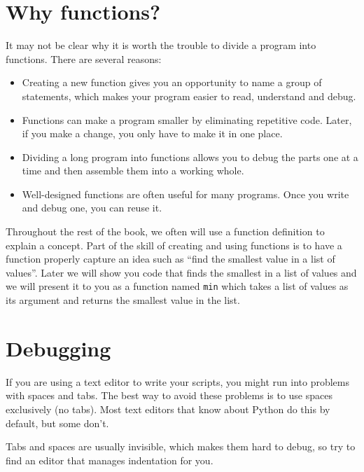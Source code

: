\documentclass[10pt]{book}
\begin{document}
\section{Why functions?}

It may not be clear why it is worth the trouble to divide
a program into functions.  There are several reasons:

\begin{itemize}

\item Creating a new function gives you an opportunity to name a group
of statements, which makes your program easier to read, understand 
and debug.

\item Functions can make a program smaller by eliminating repetitive
code.  Later, if you make a change, you only have
to make it in one place.

\item Dividing a long program into functions allows you to debug the
parts one at a time and then assemble them into a working whole.

\item Well-designed functions are often useful for many programs.
Once you write and debug one, you can reuse it.

\end{itemize}

Throughout the rest of the book, we often will use a function definition to 
explain a concept.  Part of the skill of creating and using functions is
to have a function properly capture an idea such as ``find the smallest
value in a list of values''.  Later we will show you code that finds
the smallest in a list of values and we will present it to you as a function
named {\tt min} which takes a list of values as its argument and 
returns the smallest value in the list.


\section{Debugging}
\label{editor}

If you are using a text editor to write your scripts, you might
run into problems with spaces and tabs.  The best way to avoid
these problems is to use spaces exclusively (no tabs).  Most text
editors that know about Python do this by default, but some
don't.


Tabs and spaces are usually invisible, which makes them
hard to debug, so try to find an editor that manages indentation
for you.
\end{document}
